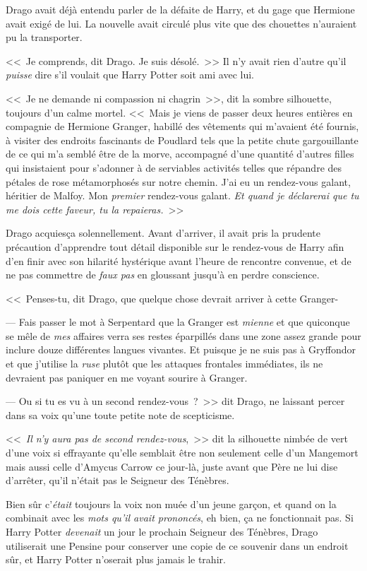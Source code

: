 Drago avait déjà entendu parler de la défaite de Harry, et du gage que Hermione avait exigé de lui. La nouvelle avait circulé plus vite que des chouettes n'auraient pu la transporter.

<<~Je comprends, dit Drago. Je suis désolé.~>> Il n'y avait rien d'autre qu'il \emph{puisse} dire s'il voulait que Harry Potter soit ami avec lui.

<<~Je ne demande ni compassion ni chagrin~>>, dit la sombre silhouette, toujours d'un calme mortel. <<~Mais je viens de passer deux heures entières en compagnie de Hermione Granger, habillé des vêtements qui m'avaient été fournis, à visiter des endroits fascinants de Poudlard tels que la petite chute gargouillante de ce qui m'a semblé être de la morve, accompagné d'une quantité d'autres filles qui insistaient pour s'adonner à de serviables activités telles que répandre des pétales de rose métamorphosés sur notre chemin. J'ai eu un rendez-vous galant, héritier de Malfoy. Mon \emph{premier} rendez-vous galant. \emph{Et quand je déclarerai que tu me dois cette faveur, tu la repaieras.}~>>

Drago acquiesça solennellement. Avant d'arriver, il avait pris la prudente précaution d'apprendre tout détail disponible sur le rendez-vous de Harry afin d'en finir avec son hilarité hystérique avant l'heure de rencontre convenue, et de ne pas commettre de \emph{faux pas} en gloussant jusqu'à en perdre conscience.

<<~Penses-tu, dit Drago, que quelque chose devrait arriver à cette Granger-

--- Fais passer le mot à Serpentard que la Granger est \emph{mienne} et que quiconque se mêle de \emph{mes} affaires verra ses restes éparpillés dans une zone assez grande pour inclure douze différentes langues vivantes. Et puisque je ne suis pas à Gryffondor et que j'utilise la \emph{ruse} plutôt que les attaques frontales immédiates, ils ne devraient pas paniquer en me voyant sourire à Granger.

--- Ou si tu es vu à un second rendez-vous~?~>> dit Drago, ne laissant percer dans sa voix qu'une toute petite note de scepticisme.

<<~\emph{Il n'y aura pas de second rendez-vous},~>> dit la silhouette nimbée de vert d'une voix si effrayante qu'elle semblait être non seulement celle d'un Mangemort mais aussi celle d'Amycus Carrow ce jour-là, juste avant que Père ne lui dise d'arrêter, qu'il n'était pas le Seigneur des Ténèbres.

Bien sûr c'\emph{était} toujours la voix non muée d'un jeune garçon, et quand on la combinait avec les \emph{mots qu'il avait prononcés}, eh bien, ça ne fonctionnait pas. Si Harry Potter \emph{devenait} un jour le prochain Seigneur des Ténèbres, Drago utiliserait une Pensine pour conserver une copie de ce souvenir dans un endroit sûr, et Harry Potter n'oserait plus jamais le trahir.


